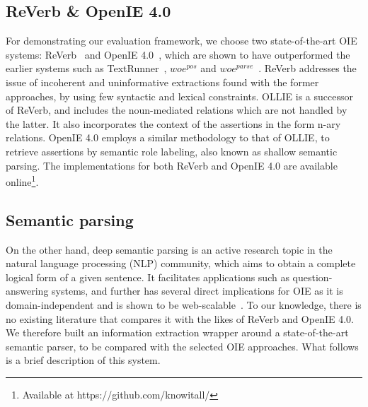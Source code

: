 \documentclass{llncs}
\begin{document}
\subsection{ReVerb \& OpenIE 4.0}
For demonstrating our evaluation framework, we choose two state-of-the-art OIE systems: ReVerb~\cite{Fader2011a} and OpenIE 4.0~\cite{Mausam2012a}, which are shown to have outperformed the earlier systems such as TextRunner~\cite{Etzioni2008a}, $woe^{pos}$ and $woe^{parse}$~\cite{Wu2010a}. ReVerb addresses the issue of incoherent and uninformative extractions found with the former approaches, by using few syntactic and lexical constraints. OLLIE is a successor of ReVerb, and includes the noun-mediated relations which are not handled by the latter. It also incorporates the context of the assertions in the form n-ary relations. OpenIE 4.0 employs a similar methodology to that of OLLIE, to retrieve assertions by semantic role labeling, also known as shallow semantic parsing. The implementations for both ReVerb and OpenIE 4.0 are available online\footnote{Available at https://github.com/knowitall/}.

\subsection{Semantic parsing}
On the other hand, deep semantic parsing is an active research topic in the natural language processing (NLP) community, which aims to obtain a complete logical form of a given sentence. It facilitates applications such as question-answering systems, and further has several direct implications for OIE as it is domain-independent and is shown to be web-scalable~\cite{Harrington2007}. To our knowledge, there is no existing literature that compares it with the likes of ReVerb and OpenIE 4.0. We therefore built an information extraction wrapper around a state-of-the-art semantic parser, to be compared with the selected OIE approaches. What follows is a brief description of this system.
\end{document}
